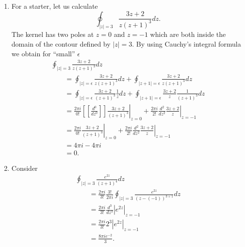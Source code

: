 {
\color{blue}
\bexample

\renewcommand{\labelenumi}{(\roman{enumi})}
\begin{enumerate}

\item For a starter,
let us calculate  $$\oint_{\vert z\vert =3} \frac{3z+2}{z(z+1)^3} dz.$$
The kernel has two poles at $z=0$ and $z=-1$ which are both inside the domain of the contour defined by $\vert z\vert =3$.
By using Cauchy's integral formula we obtain for ``small'' $\epsilon$
\begin{equation}
\begin{array}{l}
\oint_{\vert z\vert =3} \frac{3z+2}{z(z+1)^3} dz  \\
\qquad =\oint_{\vert z\vert =\epsilon} \frac{3z+2}{z(z+1)^3} dz    + \oint_{\vert z+1\vert =\epsilon} \frac{3z+2}{z(z+1)^3} dz \\
\qquad =\oint_{\vert z\vert =\epsilon} \frac{3z+2}{(z+1)^3} \frac{1}{z} dz    + \oint_{\vert z+1\vert =\epsilon} \frac{3z+2}{z}\frac{1}{(z+1)^3} dz  \\
\qquad =
\left.
\frac{2\pi i}{0!}
[[\frac{d^0}{dz^0}]]
\frac{3z+2}{(z+1)^3}
\right|_{z=0}
+
\left.
\frac{2\pi i}{2!}
\frac{d^2}{dz^2}
\frac{3z+2}{z}
\right|_{z=-1} \\
\qquad =
\left.
\frac{2\pi i}{0!}
\frac{3z+2}{(z+1)^3}
\right|_{z=0}
+
\left.
\frac{2\pi i}{2!}
\frac{d^2}{dz^2}
\frac{3z+2}{z}
\right|_{z=-1} \\
\qquad = 4\pi i - 4 \pi i \\
\qquad =0.
\end{array}
\end{equation}

\item
Consider
\begin{equation}
\begin{array}  {l}
\oint_{\vert z\vert =3}
\frac{e^{2z}}{(z+1)^4 }dz\\
\qquad =
\frac{2\pi i}{3!}
\frac{3!}{2\pi i}
\oint_{\vert z\vert =3}
\frac{e^{2z}}{(z- (-1))^{3+1} }dz  \\
\qquad =
\frac{2\pi i}{3!}
\frac{d^3}{dz^3}
\left| e^{2z} \right|_{z=-1}  \\
\qquad =
\frac{2\pi i}{3!}
2^3  \left| e^{2z} \right|_{z=-1}    \\
\qquad =
\frac{8 \pi i e^{-2}}{3}.
\end{array}
\end{equation}

\end{enumerate}
\eexample
}


